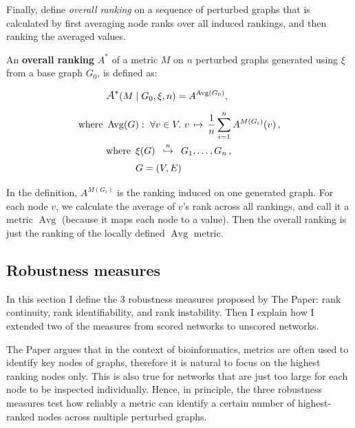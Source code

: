 Finally, define \textsl{overall ranking} on a sequence of perturbed graphs that is calculated by first averaging node ranks over all induced rankings, and then ranking the averaged values.

\begin{definition}
    \label{def:overall_ranking}
    An \textbf{overall ranking} $A^*$ of a metric $M$ on $n$ perturbed graphs generated using $\xi$ from a base graph $G_0$, is defined as:

    \begin{align*}
        &\mathlarger{A^*}\!\left( M \mid G_0, \xi, n \right) = A^{\operatorname{Avg}(G_0)} ,\\[5pt]
        \text{where}~&\operatorname{Avg}(G) :\ \forall v \in V.\ v \,\mapsto\, \frac{1}{n} \sum_{i=1}^n A^{M(G_i)}(v)\, , \\
        &\begin{aligned}
             \text{where}~\,&\xi(G) \generates{n} G_1, \dots, G_n\,, \\
             & G = (V, E)
        \end{aligned}
    \end{align*}
\end{definition}

In the definition, $A^{M(G_i)}$ is the ranking induced on one generated graph.
For each node $v$, we calculate the average of $v$'s rank across all rankings, and call it a metric $\operatorname{Avg}$ (because it maps each node to a value).
Then the overall ranking is just the ranking of the locally defined $\operatorname{Avg}$ metric.

\subsection{Robustness measures}\label{sec:robustness_measures}

In this section I define the 3 robustness measures proposed by The Paper: rank continuity, rank identifiability, and rank instability.
Then I explain how I extended two of the measures from scored networks to unscored networks.

The Paper argues that in the context of bioinformatics, metrics are often used to identify key nodes of graphs, therefore it is natural to focus on the highest ranking nodes only.
This is also true for networks that are just too large for each node to be inspected individually\citeneeded.
Hence, in principle, the three robustness measures test how reliably a metric can identify a certain number of highest-ranked nodes across multiple perturbed graphs.


